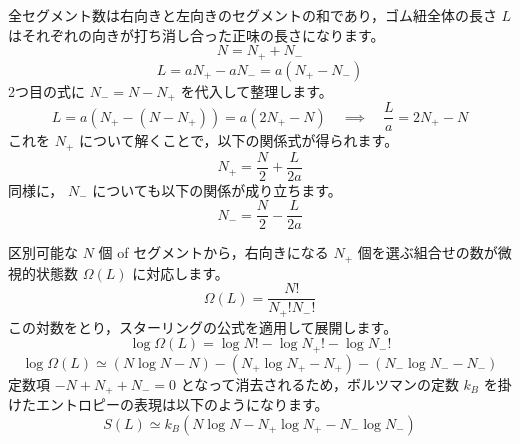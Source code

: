 \solutionheading
\begin{solutionparts}

全セグメント数は右向きと左向きのセグメントの和であり，ゴム紐全体の長さ $L$ はそれぞれの向きが打ち消し合った正味の長さになります。
\begin{equation*}
N = N_+ + N_-
\end{equation*}
\begin{equation*}
L = a N_+ - a N_- = a(N_+ - N_-)
\end{equation*}
2つ目の式に $N_- = N - N_+$ を代入して整理します。
\begin{equation*}
L = a(N_+ - (N - N_+)) = a(2N_+ - N) \quad \implies \quad \frac{L}{a} = 2N_+ - N
\end{equation*}
これを $N_+$ について解くことで，以下の関係式が得られます。
\begin{equation*}
N_+ = \frac{N}{2} + \frac{L}{2a}
\end{equation*}
同様に， $N_-$ についても以下の関係が成り立ちます。
\begin{equation*}
N_- = \frac{N}{2} - \frac{L}{2a}
\end{equation*}

区別可能な $N$ 個 of セグメントから，右向きになる $N_+$ 個を選ぶ組合せの数が微視的状態数 $\Omega(L)$ に対応します。
\begin{equation*}
\Omega(L) = \frac{N!}{N_+! N_-!}
\end{equation*}
この対数をとり，スターリングの公式を適用して展開します。
\begin{equation*}
\log \Omega(L) = \log N! - \log N_+! - \log N_-!
\end{equation*}
\begin{equation*}
\log \Omega(L) \simeq (N \log N - N) - (N_+ \log N_+ - N_+) - (N_- \log N_- - N_-)
\end{equation*}
定数項 $-N + N_+ + N_- = 0$ となって消去されるため，ボルツマンの定数 $k_B$ を掛けたエントロピーの表現は以下のようになります。
\begin{equation*}
S(L) \simeq k_B \left( N \log N - N_+ \log N_+ - N_- \log N_- \right)
\end{equation*}


\end{solutionparts}
